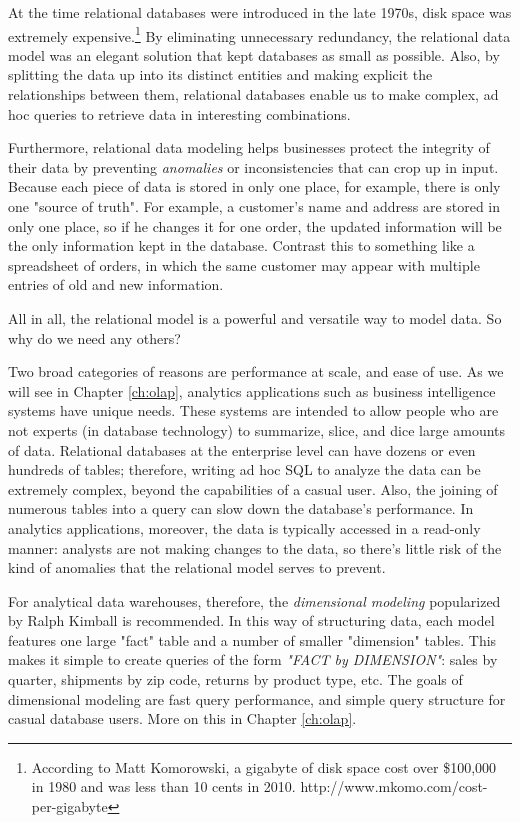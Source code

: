 \documentclass[11pt]{book}
\newcommand{\term}[1]{\emph{#1}} %
\begin{document}
At the time relational databases were introduced in the late 1970s, disk space was extremely expensive.\footnote{According to Matt Komorowski, a gigabyte of disk space cost over \$100,000 in 1980 and was less than 10 cents in 2010. http://www.mkomo.com/cost-per-gigabyte}  By eliminating unnecessary redundancy, the relational data model was an elegant solution that kept databases as small as possible.  Also, by splitting the data up into its distinct entities and making explicit the relationships between them, relational databases enable us to make complex, ad hoc queries to retrieve data in interesting combinations.  

Furthermore, relational data modeling helps businesses protect the integrity of their data by preventing \term{anomalies} or inconsistencies that can crop up in input.  Because each piece of data is stored in only one place, for example, there is only one "source of truth".  For example, a customer's name and address are stored in only one place, so if he changes it for one order, the updated information will be the only information kept in the database.  Contrast this to something like a spreadsheet of orders, in which the same customer may appear with multiple entries of old and new information.

All in all, the relational model is a powerful and versatile way to model data.  So why do we need any others?  

Two broad categories of reasons are performance at scale, and ease of use.  As we will see in Chapter \ref{ch:olap}, analytics applications such as business intelligence systems have unique needs.  These systems are intended to allow people who are not experts (in database technology) to summarize, slice, and dice large amounts of data.  Relational databases at the enterprise level can have dozens or even hundreds of tables; therefore, writing ad hoc SQL to analyze the data can be extremely complex, beyond the capabilities of a casual user.  Also, the joining of numerous tables into a query can slow down the database's performance.  In analytics applications, moreover, the data is typically accessed in a read-only manner: analysts are not making changes to the data, so there's little risk of the kind of anomalies that the relational model serves to prevent.

For analytical data warehouses, therefore, the \term{dimensional modeling} popularized by Ralph Kimball is recommended.  In this way of structuring data, each model features one large "fact" table and a number of smaller "dimension" tables.  This makes it simple to create queries of the form \emph{"FACT by DIMENSION"}: sales by quarter, shipments by zip code, returns by product type, etc.  The goals of dimensional modeling are fast query performance, and simple query structure for casual database users.  More on this in Chapter \ref{ch:olap}.
\end{document}
